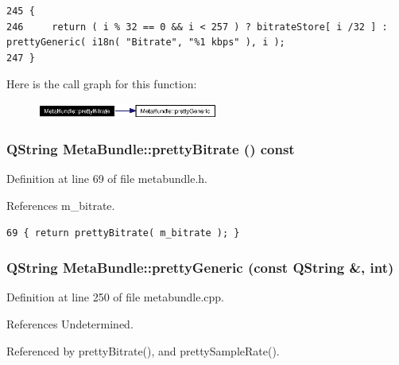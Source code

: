 \footnotesize\begin{verbatim}245 {
246     return ( i % 32 == 0 && i < 257 ) ? bitrateStore[ i /32 ] : prettyGeneric( i18n( "Bitrate", "%1 kbps" ), i );
247 }
\end{verbatim}\normalsize 


Here is the call graph for this function:\begin{figure}[H]
\begin{center}
\leavevmode
\includegraphics[width=169pt]{classMetaBundle_MetaBundlee0_cgraph}
\end{center}
\end{figure}
\subsubsection{\setlength{\rightskip}{0pt plus 5cm}QString Meta\-Bundle::pretty\-Bitrate () const\hspace{0.3cm}{\tt  [inline]}}\label{classMetaBundle_MetaBundlea19}




Definition at line 69 of file metabundle.h.

References m\_\-bitrate.



\footnotesize\begin{verbatim}69 { return prettyBitrate( m_bitrate ); }
\end{verbatim}\normalsize 
{}
\subsubsection{\setlength{\rightskip}{0pt plus 5cm}QString Meta\-Bundle::pretty\-Generic (const QString \&, int)\hspace{0.3cm}{\tt  [static, private]}}\label{classMetaBundle_MetaBundleh0}




Definition at line 250 of file metabundle.cpp.

References Undetermined.

Referenced by pretty\-Bitrate(), and pretty\-Sample\-Rate().



